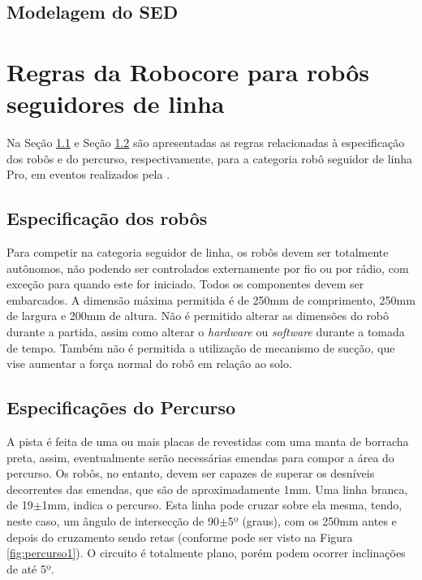 \subsection{Modelagem do SED}







\vspace{1cm}
\section{Regras da Robocore para robôs seguidores de linha} \label{cap:regras_comp}

Na Seção \ref{cap:espc_robocore} e Seção \ref{cap:perc_robocore} são apresentadas as regras relacionadas à 
especificação dos robôs e do percurso, respectivamente, 
para a categoria robô seguidor de linha Pro, em eventos realizados pela .

\vspace{1cm}
\subsection{Especificação dos robôs} \label{cap:espc_robocore}

Para competir na categoria seguidor de linha, os robôs devem ser totalmente autônomos, não podendo ser controlados 
externamente por fio ou por rádio, com exceção para quando este for iniciado. Todos os componentes devem ser embarcados. A 
dimensão máxima permitida é de 250mm   de   comprimento,   250mm   de   largura   e   200mm   de   altura. Não é 
permitido alterar as dimensões do robô durante a partida, assim como alterar o \textit{hardware} ou \textit{software} 
durante a tomada de tempo. Também não é permitida a utilização de mecanismo de sucção, 
que vise aumentar a força normal do robô em relação ao solo.

\vspace{1cm}
\subsection{Especificações do Percurso} \label{cap:perc_robocore}

A pista é feita de uma ou mais placas de  revestidas com uma manta de 
borracha preta, assim, eventualmente serão necessárias emendas para compor a área do percurso. Os robôs, no entanto, 
devem ser capazes de superar os desníveis decorrentes das emendas, que são de aproximadamente 1mm.
Uma linha branca, de 19$\pm$1mm, indica o percurso. Esta linha pode cruzar sobre ela mesma, tendo, neste caso, 
um ângulo de intersecção de 90$\pm$5º (graus), com os 250mm antes e depois do cruzamento sendo retas (conforme pode 
ser visto na Figura \ref{fig:percurso1}). O circuito é totalmente plano, porém podem ocorrer 
inclinações de até 5º.\par



